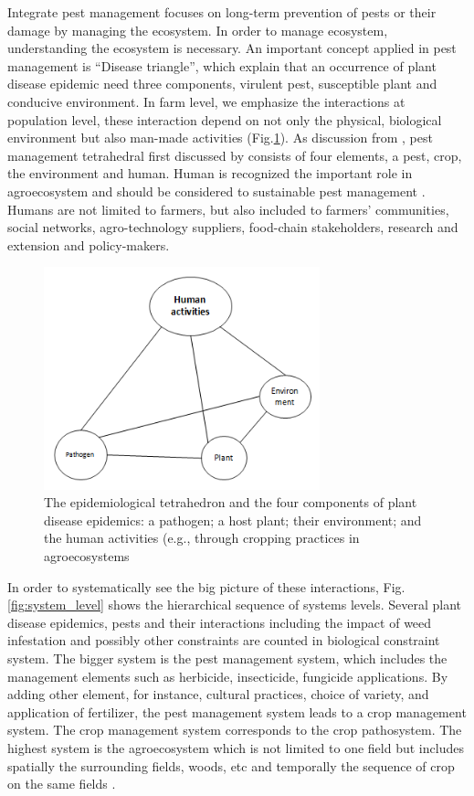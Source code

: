 Integrate pest management focuses on long-term prevention of pests or their damage by managing the ecosystem. In order to manage ecosystem, understanding the ecosystem is necessary. An important concept applied in pest management is ``Disease triangle'', which explain that an occurrence of plant disease epidemic need three components, virulent pest, susceptible plant and conducive environment. In farm level, we emphasize the interactions at population level, these interaction depend on not only the physical, biological environment but also man-made activities (Fig.\ref{fig:diseasetriangle}). As discussion from \citet{Savary:2006to}, pest management tetrahedral first discussed by \cite{Zadoks:1979ts} consists of four elements, a pest, crop, the environment and human. Human is recognized the important role in agroecosystem and should be considered to sustainable pest management \citep{Zadok1985}. Humans are not limited to farmers, but also included to farmers’ communities, social networks, agro-technology  suppliers,  food-chain  stakeholders,  research  and extension and policy-makers.

\begin{figure}
\includegraphics[width=8cm]{distriangle}
\centering
\caption{The epidemiological tetrahedron and the four components of plant disease epidemics: a pathogen; a host plant; their environment; and the human activities (e.g., through cropping practices in agroecosystems}
\label{fig:diseasetriangle}
\end{figure}

In order to systematically see the big picture of these interactions, Fig. \ref{fig:system_level} shows the hierarchical sequence of systems levels.  Several plant disease epidemics, pests and their interactions including the impact of weed infestation and possibly other constraints are counted in biological constraint system. The bigger system is the pest management system, which includes the management elements such as herbicide, insecticide, fungicide applications. By adding other element, for instance, cultural practices, choice of variety, and application of fertilizer, the pest management system leads to a crop management system. The crop management system corresponds to the crop pathosystem. The highest system is the agroecosystem which is not limited to one field but includes spatially the surrounding fields, woods, etc and temporally the sequence of crop on the same fields \citep{kranz1980systems}.

